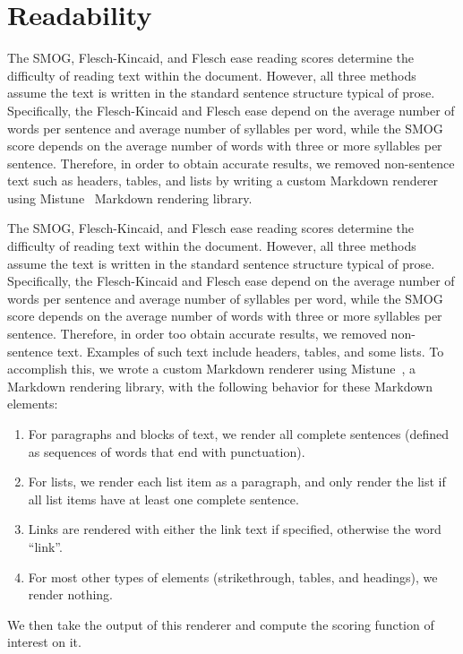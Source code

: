 



\iffalse
\section{Readability}
\label{apd:readability_metrics}

The SMOG, Flesch-Kincaid, and Flesch ease reading scores determine the difficulty of reading text within the document. However, all three methods assume the text is written in the standard sentence structure typical of prose. Specifically, the Flesch-Kincaid and Flesch ease depend on the average number of words per sentence and average number of syllables per word, while the SMOG score depends on the average number of words with three or more syllables per sentence.
Therefore, in order to obtain accurate results, we removed non-sentence text
such as headers, tables, and lists by writing a custom Markdown renderer using Mistune~\cite{mistune} Markdown rendering library.

The SMOG, Flesch-Kincaid, and Flesch ease reading scores determine the difficulty of reading text within the document. However, all three methods assume the text is written in the standard sentence structure typical of prose. Specifically, the Flesch-Kincaid and Flesch ease depend on the average number of words per sentence and average number of syllables per word, while the SMOG score depends on the average number of words with three or more syllables per sentence.
Therefore, in order too obtain accurate results, we removed non-sentence text. Examples of such text include headers, tables, and some lists. To accomplish this, we wrote a custom Markdown renderer using Mistune~\cite{mistune}, a Markdown rendering library, with the following behavior for these Markdown elements:
\begin{enumerate}
    \item For paragraphs and blocks of text, we render all complete sentences (defined as sequences of words that end with punctuation).
    \item For lists, we render each list item as a paragraph, and only render the list if all list items have at least one complete sentence.
    \item Links are rendered with either the link text if specified, otherwise the word ``link''.
    \item For most other types of elements (strikethrough, tables, and headings), we render nothing.
\end{enumerate}
We then take the output of this renderer and compute the scoring function of interest on it.

